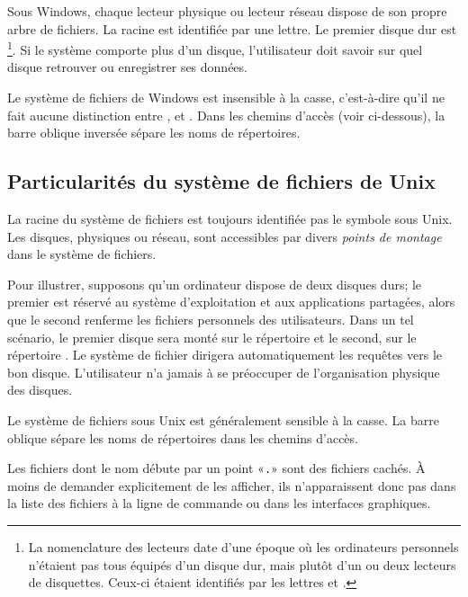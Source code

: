 Sous Windows, chaque lecteur physique ou lecteur réseau dispose de son
propre arbre de fichiers. La racine est identifiée par une lettre. Le
premier disque dur est \footnote{%
  La nomenclature des lecteurs date d'une époque où les ordinateurs
  personnels n'étaient pas tous équipés d'un disque dur, mais plutôt
  d'un ou deux lecteurs de disquettes. Ceux-ci étaient identifiés par
  les lettres  et .}. %
Si le système comporte plus d'un disque, l'utilisateur doit savoir sur
quel disque retrouver ou enregistrer ses données.

Le système de fichiers de Windows est insensible à la casse,
c'est-à-dire qu'il ne fait aucune distinction entre ,  et . Dans les
chemins d'accès (voir ci-dessous), la barre oblique inversée
{\bs} sépare les noms de répertoires.

\subsection{Particularités du système de fichiers de Unix}
\label{sec:informatique:fs:unix}

La racine du système de fichiers est toujours identifiée pas le
symbole \code{/} sous Unix. Les disques, physiques ou
réseau, sont accessibles par divers \emph{points de montage} dans le
système de fichiers.

Pour illustrer, supposons qu'un ordinateur dispose de deux disques
durs; le premier est réservé au système d'exploitation et aux
applications partagées, alors que le second renferme les fichiers
personnels des utilisateurs. Dans un tel scénario, le premier disque
sera monté sur le répertoire \code{/} et le second, sur le répertoire
. Le système de fichier dirigera automatiquement les
requêtes vers le bon disque. L'utilisateur n'a jamais à se préoccuper
de l'organisation physique des disques.


Le système de fichiers sous Unix est généralement sensible à la casse.
La barre oblique \code{/} sépare les noms de répertoires dans les
chemins d'accès.

Les fichiers dont le nom débute par un point «\verb=.=» sont des
fichiers cachés. À moins de demander explicitement de les afficher,
ils n'apparaissent donc pas dans la liste des fichiers à la ligne de
commande ou dans les interfaces graphiques.

